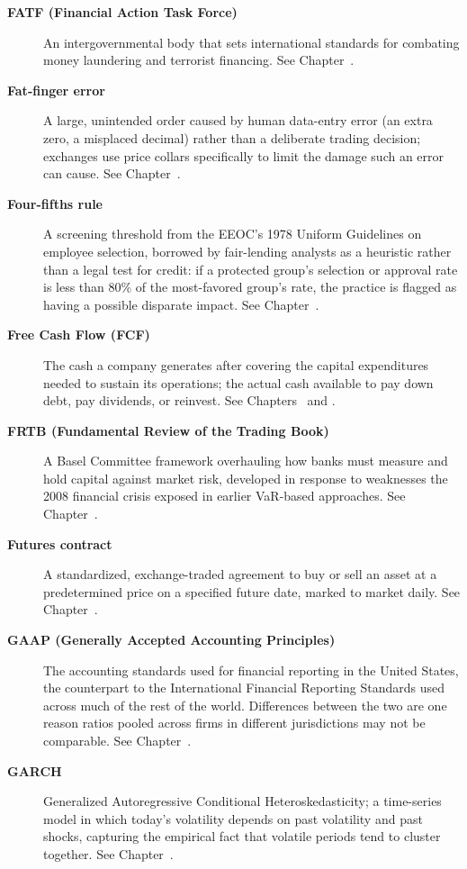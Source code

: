 \documentclass[../ai_in_finance]{subfiles}
\begin{document}
\begin{description}
\item[\textbf{FATF (Financial Action Task Force)}] An intergovernmental body that sets international standards for combating money laundering and terrorist financing. See Chapter~.

\item[\textbf{Fat-finger error}] A large, unintended order caused by human data-entry error (an extra zero, a misplaced decimal) rather than a deliberate trading decision; exchanges use price collars specifically to limit the damage such an error can cause. See Chapter~.

\item[\textbf{Four-fifths rule}] A screening threshold from the EEOC's 1978 Uniform Guidelines on employee selection, borrowed by fair-lending analysts as a heuristic rather than a legal test for credit: if a protected group's selection or approval rate is less than 80\% of the most-favored group's rate, the practice is flagged as having a possible disparate impact. See Chapter~.

\item[\textbf{Free Cash Flow (FCF)}] The cash a company generates after covering the capital expenditures needed to sustain its operations; the actual cash available to pay down debt, pay dividends, or reinvest. See Chapters~ and .

\item[\textbf{FRTB (Fundamental Review of the Trading Book)}] A Basel Committee framework overhauling how banks must measure and hold capital against market risk, developed in response to weaknesses the 2008 financial crisis exposed in earlier VaR-based approaches. See Chapter~.

\item[\textbf{Futures contract}] A standardized, exchange-traded agreement to buy or sell an asset at a predetermined price on a specified future date, marked to market daily. See Chapter~.

\item[\textbf{GAAP (Generally Accepted Accounting Principles)}] The accounting standards used for financial reporting in the United States, the counterpart to the International Financial Reporting Standards used across much of the rest of the world. Differences between the two are one reason ratios pooled across firms in different jurisdictions may not be comparable. See Chapter~.
\item[\textbf{GARCH}] Generalized Autoregressive Conditional Heteroskedasticity; a time-series model in which today's volatility depends on past volatility and past shocks, capturing the empirical fact that volatile periods tend to cluster together. See Chapter~.


\end{description}
\end{document}
